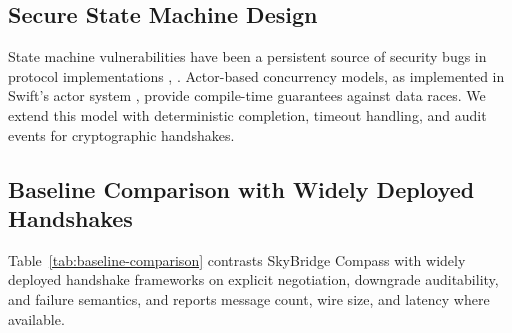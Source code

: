 \documentclass[10pt,journal,compsoc]{IEEEtran}
\begin{document}
\subsection{Secure State Machine
Design}\label{e.-secure-state-machine-design}

State machine vulnerabilities have been a persistent source of security
bugs in protocol implementations \cite{ref11}, \cite{ref30}. Actor-based concurrency
models, as implemented in Swift's actor system \cite{ref12}, provide
compile-time guarantees against data races. We extend this model with
deterministic completion, timeout handling, and audit events for
cryptographic handshakes.

\subsection{Baseline Comparison with Widely Deployed
Handshakes}\label{sec:baseline-comparison}

Table~\ref{tab:baseline-comparison} contrasts SkyBridge Compass with
widely deployed handshake frameworks on explicit negotiation, downgrade
auditability, and failure semantics, and reports message count, wire
size, and latency where available.
\end{document}
